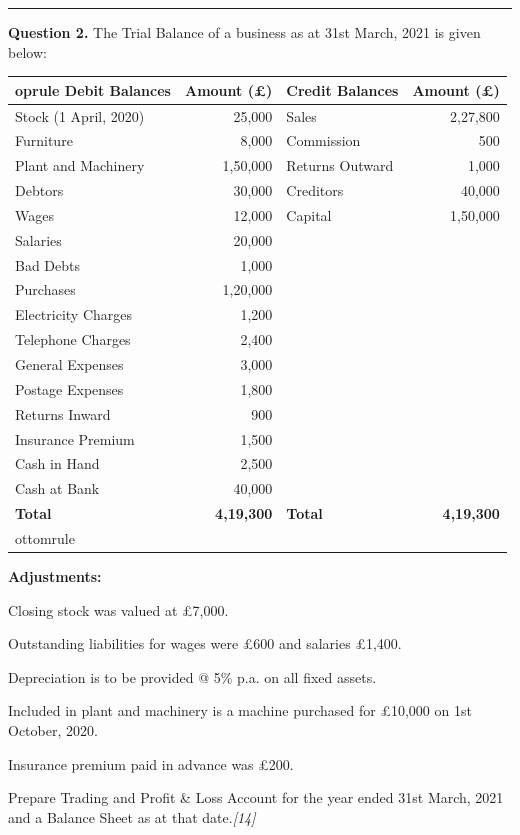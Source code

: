 \documentclass[11pt,a4paper]{article}
\newcommand{\pts}[1]{\hfill   \textit{[#1]}}
\begin{document}
\medskip\rule{\linewidth}{0.2pt}


\newpage




\noindent   \textbf{Question 2.}
The Trial Balance of a business as at 31st March, 2021 is given below:


\begin{center}

\begin{tabular}{lr|lr}
 oprule
   \textbf{Debit Balances} &   \textbf{Amount (\pounds)} &   \textbf{Credit Balances} &   \textbf{Amount (\pounds)} \\
\midrule
Stock (1 April, 2020) & 25,000 & Sales & 2,27,800 \\
Furniture & 8,000 & Commission & 500 \\
Plant and Machinery & 1,50,000 & Returns Outward & 1,000 \\
Debtors & 30,000 & Creditors & 40,000 \\
Wages & 12,000 & Capital & 1,50,000 \\
Salaries & 20,000 & & \\
Bad Debts & 1,000 & & \\
Purchases & 1,20,000 & & \\
Electricity Charges & 1,200 & & \\
Telephone Charges & 2,400 & & \\
General Expenses & 3,000 & & \\
Postage Expenses & 1,800 & & \\
Returns Inward & 900 & & \\
Insurance Premium & 1,500 & & \\
Cash in Hand & 2,500 & & \\
Cash at Bank & 40,000 & & \\
\midrule
   \textbf{Total} &   \textbf{4,19,300} &   \textbf{Total} &   \textbf{4,19,300} \\
ottomrule
\end{tabular}
\end{center}




\noindent   \textbf{Adjustments:}

\begin{parts}
  \item Closing stock was valued at \pounds 7,000.
  \item Outstanding liabilities for wages were \pounds 600 and salaries \pounds 1,400.
  \item Depreciation is to be provided @ 5\% p.a. on all fixed assets.
  \item Included in plant and machinery is a machine purchased for \pounds 10,000 on 1st October, 2020.
  \item Insurance premium paid in advance was \pounds 200.
\end{parts}
Prepare Trading and Profit \& Loss Account for the year ended 31st March, 2021 and a Balance Sheet as at that date.\pts{14}
\end{document}
